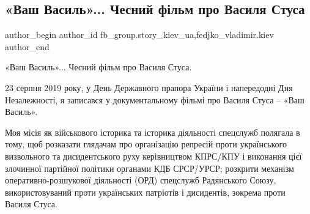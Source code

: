  
 
 
 
 
 
\subsection{«Ваш Василь»... Чесний фільм про Василя Стуса}
\label{sec:07_12_2021.fb.fb_group.story_kiev_ua.2.vasyl_stus_film}
 
\ifcmt
 author_begin
   author_id fb_group.story_kiev_ua,fedjko_vladimir.kiev
 author_end
\fi

«Ваш Василь»... Чесний фільм про Василя Стуса.

23 серпня 2019 року, у День Державного прапора України і напередодні Дня
Незалежності, я записався у документальному фільмі про Василя Стуса – «Ваш
Василь». 


Моя місія як військового історика та історика діяльності спецслужб полягала в
тому, щоб розказати глядачам про організацію репресій проти українського
визвольного та дисидентського руху керівництвом КПРС/КПУ і виконання цієї
злочинної партійної політики органами КДБ СРСР/УРСР; розкрити механізм
оперативно-розшукової діяльності (ОРД) спецслужб Радянського Союзу,
використовуваний проти українських патріотів і дисидентів, зокрема проти Василя
Стуса.

\begin{multicols}{2} %
\setlength{\parindent}{0pt}


\end{multicols} %

